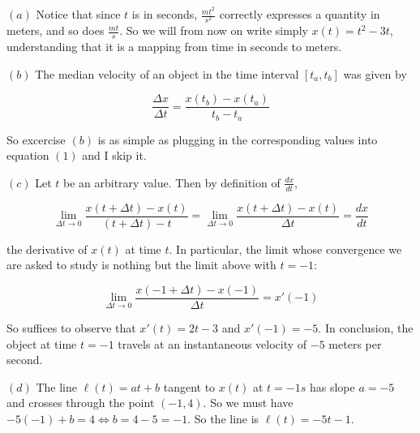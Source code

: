 \documentclass[12pt]{article}
\theoremstyle{definition}
\begin{document}
$(a)$ Notice that since $t$ is in seconds, $\frac{mt^2}{s^2}$ correctly
expresses a quantity in meters, and so does $\frac{mt}{s}$. So we will from now
on write simply $x(t) = t^2 - 3t$, understanding that it is a mapping from time
in seconds to meters.



$(b)$ The median velocity of an object in the time interval $[t_a, t_b]$  was
given by 

\begin{equation}
    \frac{\Delta x}{\Delta t} = \frac{ x(t_b) - x(t_a) }{t_b - t_a}
\end{equation}

So excercise $(b)$ is as simple as plugging in the corresponding values into
equation $(1)$ and I skip  it. 

$(c)$ Let $t$ be an arbitrary value. Then by definition of $\frac{dx}{dt}$,

\begin{equation*}
    \lim_{\Delta t \to 0 } \frac{x(t + \Delta t) - x(t)}{(t + \Delta t) -
    t} =\lim_{\Delta t \to 0 } \frac{ x(t + \Delta t) - x(t) }{\Delta t} = \frac{dx}{dt}
\end{equation*}

the derivative of $x(t)$ at time $t$. In particular, the limit whose convergence
we are asked to study is nothing but the limit above with $t = -1$:

\begin{equation*}
    \lim_{\Delta t \to 0 } \frac{x(-1 + \Delta t) - x(-1)}{\Delta t} = x'(-1)
\end{equation*}

So suffices to observe that $x'(t) = 2t - 3$ and $x'(-1) = -5$. In conclusion, 
the object at time $t = -1$ travels at an instantaneous velocity of $-5$ meters
per second.

$(d)$ The line $\ell(t) = at + b$ tangent to $x(t)$ at $t = -1s$ has slope $a =
-5$ and crosses through the point $(-1, 4)$. So we must have $-5(-1) + b = 4
\iff b = 4 - 5 = -1$. So the line is $\ell(t) = -5t - 1$.
\end{document}
